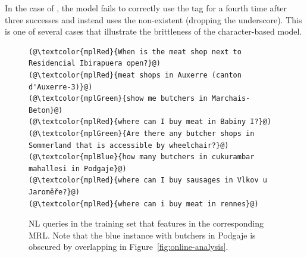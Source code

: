 In the case of , the model fails to correctly use
the tag for a fourth time after three successes and instead uses the
non-existent  (dropping the underscore). This is one
of several cases that illustrate the brittleness of the character-based model.

\begin{figure}[h]
  \centering
  \begin{lstlisting}[style=MyNL]
(@\textcolor{mplRed}{When is the meat shop next to Residencial Ibirapuera open?}@)
(@\textcolor{mplRed}{meat shops in Auxerre (canton d'Auxerre-3)}@)
(@\textcolor{mplGreen}{show me butchers in Marchais-Beton}@)
(@\textcolor{mplRed}{where can I buy meat in Babiny I?}@)
(@\textcolor{mplGreen}{Are there any butcher shops in Sommerland that is accessible by wheelchair?}@)
(@\textcolor{mplBlue}{how many butchers in cukurambar mahallesi in Podgaje}@)
(@\textcolor{mplRed}{where can I buy sausages in Vlkov u Jaroměře?}@)
(@\textcolor{mplRed}{where can i buy meat in rennes}@)
  \end{lstlisting}
  \caption[NL queries for butchers]{NL queries in the \nlmfour{} training set
    that features  in the corresponding MRL. Note that the
    blue instance with butchers in Podgaje is obscured by overlapping in
    Figure~\ref{fig:online-analysis}.}
  \label{fig:butcher-nl}
\end{figure}



